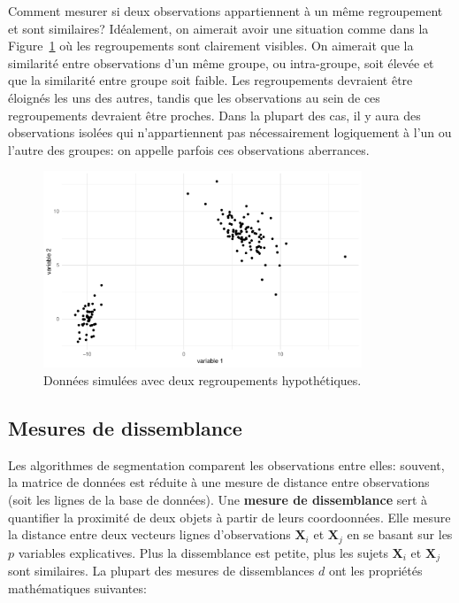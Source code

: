 \documentclass[
  11pt,
  letterpaper,
]{scrbook}
\theoremstyle{definition}
\theoremstyle{remark}
\begin{document}
Comment mesurer si deux observations appartiennent à un même
regroupement et sont similaires? Idéalement, on aimerait avoir une
situation comme dans la Figure~\ref{fig-regroupements-bidons} où les
regroupements sont clairement visibles. On aimerait que la similarité
entre observations d'un même groupe, ou intra-groupe, soit élevée et que
la similarité entre groupe soit faible. Les regroupements devraient être
éloignés les uns des autres, tandis que les observations au sein de ces
regroupements devraient être proches. Dans la plupart des cas, il y aura
des observations isolées qui n'appartiennent pas nécessairement
logiquement à l'un ou l'autre des groupes: on appelle parfois ces
observations aberrances.

\begin{figure}[ht!]

{\centering \includegraphics[width=0.85\textwidth,height=\textheight]{regroupements_files/figure-pdf/fig-regroupements-bidons-1.pdf}

}

\caption{\label{fig-regroupements-bidons}Données simulées avec deux
regroupements hypothétiques.}

\end{figure}

\hypertarget{mesures-de-dissemblance-1}{%
\subsection{Mesures de dissemblance}\label{mesures-de-dissemblance-1}}

Les algorithmes de segmentation comparent les observations entre elles:
souvent, la matrice de données est réduite à une mesure de distance
entre observations (soit les lignes de la base de données). Une
\textbf{mesure de dissemblance} sert à quantifier la proximité de deux
objets à partir de leurs coordoonnées. Elle mesure la distance entre
deux vecteurs lignes d'observations \(\mathbf{X}_i\) et \(\mathbf{X}_j\)
en se basant sur les \(p\) variables explicatives. Plus la dissemblance
est petite, plus les sujets \(\mathbf{X}_i\) et \(\mathbf{X}_j\) sont
similaires. La plupart des mesures de dissemblances \(d\) ont les
propriétés mathématiques suivantes:
\end{document}
